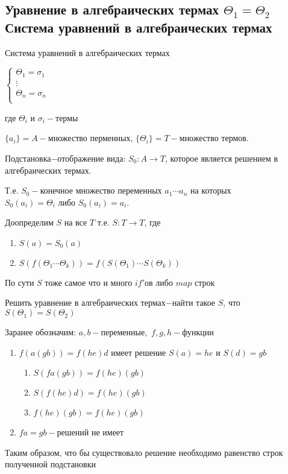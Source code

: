 	\subsection{Уравнение в алгебраических термах $\Theta_1=\Theta_2$\\Система уравнений в алгебраических термах}
	\begin{definition}Система уравнений в алгебраических термах\end{definition}
	$		
		\begin{cases}			
			\Theta_1=\sigma_1&\\
			\vdots&\\
			\Theta_n=\sigma_n&\\
		\end{cases}
	$\par где $\Theta_i \text{ и } \sigma_i-\text{термы}$\par
	\begin{definition}$\{a_i\}=A-$множество перменных, $\{\Theta_i\}=T-$множество термов.\end{definition}
	\begin{definition}Подстановка$-$отображение вида: $S_0:A\to T$, которое является решением в алгебраических термах.\end{definition} Т.е. $S_0-$конечное множество переменных $a_1\dotsb a_n$ на которых $S_0(a_i)=\Theta_i\text{ либо }S_0(a_i)=a_i$.\par
	Доопределим $S$ на все $T$ т.е. $S:T\to T$, где \begin{enumerate}
		\item $S(a)=S_0(a)$
		\item $S(f(\Theta_1 \dotsb \Theta_k))=f(S(\Theta_1) \dotsb S(\Theta_k))$
	\end{enumerate}
	По сути $S$ тоже самое что и много $if'$ов либо $map$ строк\par 
	\begin{definition}Решить уравнение в алгебраических термах$-$найти такое $S$, что $S(\Theta_1)=S(\Theta_2)$\end{definition} 
	\begin{example}\end{example}
		Заранее обозначим: $a,b-\text{переменные},$ $f,g,h-\text{функции}$
		\begin{enumerate}
			\item $f(a(gb))=f(he)d$ имеет решение $S(a)=he\text{ и }S(d)=gb$
				\begin{enumerate}
					\item $S(fa(gb))=f(he)(gb)$
					\item $S(f(he)d)=f(he)(gb)$
					\item $f(he)(gb)=f(he)(gb)$
				\end{enumerate}
			\item $fa=gb-$решений не имеет
		\end{enumerate}
		Таким образом, что бы существовало решение необходимо равенство строк полученной подстановки\par
